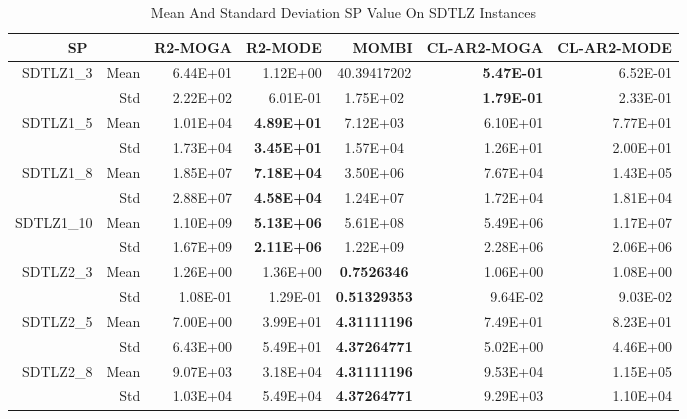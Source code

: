 \begin{table*}[htbp]
  \centering
  \caption{Mean And Standard Deviation SP Value On SDTLZ Instances}
    \begin{tabular}{rrrrrrr}
    \toprule
    \multicolumn{2}{c}{SP} & R2-MOGA & R2-MODE & MOMBI & CL-AR2-MOGA & CL-AR2-MODE \\
    \midrule
    \multirow{2}[0]{*}{SDTLZ1\_3} & Mean  & 6.44E+01 & 1.12E+00 & \multicolumn{1}{c}{40.39417202} & \textbf{5.47E-01} & 6.52E-01 \\
          & Std   & 2.22E+02 & 6.01E-01 & \multicolumn{1}{c}{1.75E+02} & \textbf{1.79E-01} & 2.33E-01 \\
    \multirow{2}[0]{*}{SDTLZ1\_5} & Mean  & 1.01E+04 & \textbf{4.89E+01} & \multicolumn{1}{c}{7.12E+03} & 6.10E+01 & 7.77E+01 \\
          & Std   & 1.73E+04 & \textbf{3.45E+01} & \multicolumn{1}{c}{1.57E+04} & 1.26E+01 & 2.00E+01 \\
    \multirow{2}[0]{*}{SDTLZ1\_8} & Mean  & 1.85E+07 & \textbf{7.18E+04} & \multicolumn{1}{c}{3.50E+06} & 7.67E+04 & 1.43E+05 \\
          & Std   & 2.88E+07 & \textbf{4.58E+04} & \multicolumn{1}{c}{1.24E+07} & 1.72E+04 & 1.81E+04 \\
    \multirow{2}[0]{*}{SDTLZ1\_10} & Mean  & 1.10E+09 & \textbf{5.13E+06} & \multicolumn{1}{c}{5.61E+08} & 5.49E+06 & 1.17E+07 \\
          & Std   & 1.67E+09 & \textbf{2.11E+06} & \multicolumn{1}{c}{1.22E+09} & 2.28E+06 & 2.06E+06 \\
    \multirow{2}[0]{*}{SDTLZ2\_3} & Mean  & 1.26E+00 & 1.36E+00 & \multicolumn{1}{c}{\textbf{0.7526346}} & 1.06E+00 & 1.08E+00 \\
          & Std   & 1.08E-01 & 1.29E-01 & \multicolumn{1}{c}{\textbf{0.51329353}} & 9.64E-02 & 9.03E-02 \\
    \multirow{2}[0]{*}{SDTLZ2\_5} & Mean  & 7.00E+00 & 3.99E+01 & \multicolumn{1}{c}{\textbf{4.31111196}} & 7.49E+01 & 8.23E+01 \\
          & Std   & 6.43E+00 & 5.49E+01 & \multicolumn{1}{c}{\textbf{4.37264771}} & 5.02E+00 & 4.46E+00 \\
    \multirow{2}[0]{*}{SDTLZ2\_8} & Mean  & 9.07E+03 & 3.18E+04 & \multicolumn{1}{c}{\textbf{4.31111196}} & 9.53E+04 & 1.15E+05 \\
          & Std   & 1.03E+04 & 5.49E+04 & \multicolumn{1}{c}{\textbf{4.37264771}} & 9.29E+03 & 1.10E+04 \\

\end{tabular}
\end{table*}
